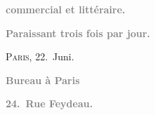 \pstart
           \begin{otherlanguage}{french}\textcolor{gray}{\textbf{commercial et littéraire.}}\end{otherlanguage}\pend
           
\pstart
           \begin{otherlanguage}{french}\textcolor{gray}{\textbf{\textbf{Paraissant trois fois par jour.}}}\end{otherlanguage}\hfill \textsc{Paris}, 22. Juni.\pend
           
\pstart
           \begin{otherlanguage}{french}\textcolor{gray}{\textbf{\textbf{Bureau à Paris}}}\end{otherlanguage}\pend
           
\pstart
           \begin{otherlanguage}{french}\textcolor{gray}{\textbf{\textbf{24. Rue Feydeau.}}}\end{otherlanguage}\pend
           
